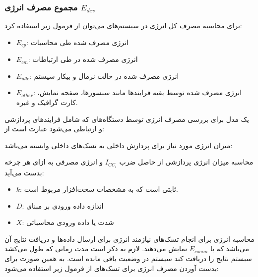 \documentclass[a4paper]{article}
\begin{document}
\subsubsection{مجموع مصرف انرژی $E_{dev}$}

برای محاسبه مصرف کل انرژی در سیستم‌های  می‌توان از فرمول زیر استفاده
کرد:


\begin{itemize}
    \item $E_{cp}$: انرژی مصرف شده طی محاسبات
    \item $E_{cm}$: انرژی مصرف شده در طی ارتباطات
    \item $E_{idle}$: انرژی مصرف شده در حالت نرمال و بیکار سیستم
    \item $E_{other}$: انرژی مصرف شده توسط بقیه فرایند‌ها مانند سنسور‌ها، صفحه
    نمایش، کارت گرافیک و غیره.
\end{itemize}

یک مدل برای بررسی مصرف انرژی توسط دستگاه‌های  که شامل فرایند‌های پردازشی
و ارتباطی می‌شود عبارت است از:


میزان انرژی مورد نیاز برای پردازش داخلی به تسک‌های داخلی وابسته می‌باشد:


محاسبه میزان انرژی پردازشی از حاصل ضرب $I_{CC_i}$ و انرژی مصرفی  به ازای
هر چرخه  بدست می‌آید:


\begin{itemize}
    \item $k$: ثابتی است که به مشخصات سخت‌افزار مربوط است.
    \item $D$: اندازه داده ورودی بر مبنای 
    \item $X$: شدت یا داده ورودی محاسباتی
\end{itemize}

محاسبه انرژی برای انجام تسک‌های  نیازمند انرژی برای ارسال داده‌ها
و دریافت نتایج آن می‌باشد که با $E_{comm}$ نمایش می‌دهند. لازم به ذکر است مدت
زمانی که طول می‌کشد سیستم نتایج را دریافت کند سیستم در وضعیت  باقی
مانده است. به همین صورت برای بدست آوردن مصرف انرژی برای تسک‌های 
از فرمول زیر استفاده می‌شود:

\end{document}
